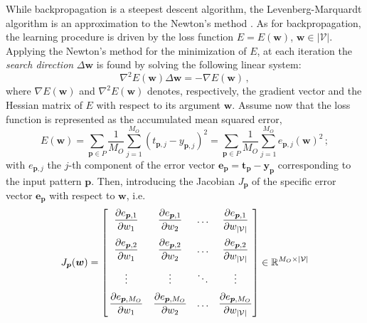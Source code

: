 \documentclass[11pt, a4paper]{report}
\numberwithin{equation}{chapter}
\theoremstyle{theorem}
\theoremstyle{definition}
\numberwithin{figure}{section}
\begin{document}
		While backpropagation is a steepest descent algorithm, the Levenberg-Marquardt algorithm \cite{Mar63} is an approximation to the Newton's method \cite{Hag94}. As for backpropagation, the learning procedure is driven by the loss function $E = E(\boldsymbol{w})$, $\boldsymbol{w} \in |\mathcal{V}|$. Applying the Newton's method for the minimization of $E$, at each iteration the \emph{search direction} $\Delta \boldsymbol{w}$ is found by solving the following linear system:
		\begin{equation}
			\label{eq:newton}
			\nabla^2 E(\boldsymbol{w}) \Delta \boldsymbol{w} = - \nabla E(\boldsymbol{w}) \, ,
		\end{equation}
		where $\nabla E(\boldsymbol{w})$ and $\nabla^2 E(\boldsymbol{w})$ denotes, respectively, the gradient vector and the Hessian matrix of $E$ with respect to its argument $\boldsymbol{w}$. Assume now that the loss function is represented as the accumulated mean squared error, 
		\begin{equation}
			\label{eq:accumulated-mse-bis}
			E(\boldsymbol{w}) = \sum_{\boldsymbol{p} \in P} \dfrac{1}{M_O} \sum_{j = 1}^{M_O} \left( t_{\boldsymbol{p},j} - y_{\boldsymbol{p},j} \right)^2 = \sum_{\boldsymbol{p} \in P} \dfrac{1}{M_O} \sum_{j = 1}^{M_O} e_{\boldsymbol{p},j}(\boldsymbol{w})^2 \, ;
		\end{equation}
		with $e_{\boldsymbol{p},j}$ the $j$-th component of the error vector $\boldsymbol{e}_{\boldsymbol{p}} = \boldsymbol{t}_{\boldsymbol{p}} - \boldsymbol{y}_{\boldsymbol{p}}$ corresponding to the input pattern $\boldsymbol{p}$. Then, introducing the Jacobian $J_{\boldsymbol{p}}$ of the specific error vector $\boldsymbol{e}_{\boldsymbol{p}}$ with respect to $\boldsymbol{w}$, i.e. 
		\begin{equation}
			\label{eq:jacobian}
			J_{\boldsymbol{p}}(\boldsymbol{w}) = 
			\begin{bmatrix}
				\vspace*{0.2cm}
				\hspace*{-0.3cm} & \dfrac{\partial e_{\boldsymbol{p},1}}{\partial w_1} & \dfrac{\partial e_{\boldsymbol{p},1}}{\partial w_2} & \ldots & \dfrac{\partial e_{\boldsymbol{p},1}}{\partial w_{|\mathcal{V}|}} \\
				\vspace*{0.2cm}
				\hspace*{-0.3cm} & \dfrac{\partial e_{\boldsymbol{p},2}}{\partial w_1} & \dfrac{\partial e_{\boldsymbol{p},2}}{\partial w_2} & \ldots & \dfrac{\partial e_{\boldsymbol{p},2}}{\partial w_{|\mathcal{V}|}} \\
				\vspace*{0.2cm}
				\hspace*{-0.3cm} & \vdots & \vdots & \ddots & \vdots \\
				\hspace*{-0.3cm} & \dfrac{\partial e_{\boldsymbol{p},M_O}}{\partial w_1} & \dfrac{\partial e_{\boldsymbol{p},M_O}}{\partial w_2} & \ldots & \dfrac{\partial e_{\boldsymbol{p},M_O}}{\partial w_{|\mathcal{V}|}}
			\end{bmatrix}
			\in \mathbb{R}^{M_O \times |\mathcal{V}|}
		\end{equation}
\end{document}
